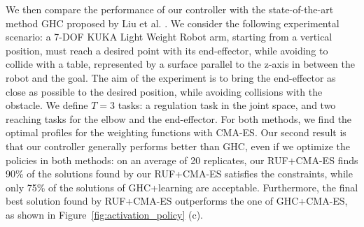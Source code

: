 \documentclass[final,5p,twocolumn]{elsarticle}
\begin{document}
We then compare the performance of our controller with the state-of-the-art
method GHC proposed by Liu et al. \cite{liu2015}. We consider the
following experimental scenario: a 7-DOF KUKA Light Weight Robot arm, starting
from a vertical position, must reach a desired point with its end-effector,
while avoiding to collide with a table, represented by a surface parallel to the
z-axis in between the robot and the goal. The aim of the experiment is to bring
the end-effector as close as possible to the desired position, while avoiding
collisions with the obstacle. We define  $T=3$ tasks: a regulation task in the
joint space, and two reaching tasks for the elbow and the end-effector. For both
methods, we find the optimal profiles for the weighting functions with CMA-ES.
Our second result is that our controller generally performs better than GHC,
even if we optimize the policies in both methods: on an average of 20
replicates, our RUF+CMA-ES finds 90\% of the solutions found by our RUF+CMA-ES
satisfies the constraints, while only 75\% of the solutions of GHC+learning are
acceptable. Furthermore, the final best solution found by RUF+CMA-ES outperforms
the one of GHC+CMA-ES, as shown in Figure~\ref{fig:activation_policy} (c).
\end{document}
